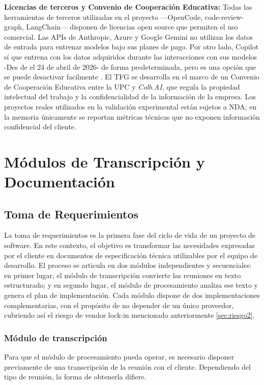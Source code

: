 \documentclass[11pt, letterpaper]{article}
\begin{document}
\begin{description}
    \item \textbf{Licencias de terceros y Convenio de Cooperación Educativa: } Todas las herramientas de terceros utilizadas en el proyecto —OpenCode, code-review-graph, LangChain— disponen de licencias open source que permiten el uso comercial. Las APIs de Anthropic, Azure y Google Gemini no utilizan los datos de entrada para entrenar modelos bajo sus planes de pago. Por otro lado, Copilot sí que entrena con los datos adquiridos durante las interacciones con sus modelos -Des de el 24 de abril de 2026- de forma predeterminada, pero es una opción que se puede desactivar facilmente \cite{rodriguez2026copilot}. El TFG se desarrolla en el marco de un Convenio de Cooperación Educativa entre la UPC y \textit{Colb.AI}, que regula la propiedad intelectual del trabajo y la confidencialidad de la información de la empresa. Los proyectos reales utilizados en la validación experimental están sujetos a NDA; en la memoria únicamente se reportan métricas técnicas que no exponen información confidencial del cliente.
\end{description}

\newpage

\section{Módulos de Transcripción y Documentación}
\label{sec:modulos_transcripcion}

\subsection{Toma de Requerimientos}
\label{sec:toma_requerimientos_cap}
La toma de requerimientos es la primera fase del ciclo de vida de un proyecto de software. En este contexto, el objetivo es transformar las necesidades expresadas por el cliente en documentos de especificación técnica utilizables por el equipo de desarrollo. El proceso se articula en dos módulos independientes y secuenciales: en primer lugar, el módulo de transcripción convierte las reuniones en texto estructurado; y en segundo lugar, el módulo de procesamiento analiza ese texto y genera el plan de implementación. Cada módulo dispone de dos implementaciones complementarias, con el propósito de no depender de un único proveedor, cubriendo así el riesgo de vendor lock-in mencionado anteriormente \ref{sec:riesgo2}.

\subsubsection{Módulo de transcripción}
\label{sec:modulo_transcripcion}
Para que el módulo de procesamiento pueda operar, es necesario disponer previamente de una transcripción de la reunión con el cliente. Dependiendo del tipo de reunión, la forma de obtenerla difiere.
\end{document}
